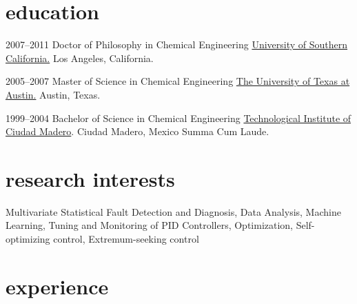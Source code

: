 \documentclass[]{../friggeri-cv} %
\begin{document}
\section{education}

\begin{entrylist}


\entry
{2007--2011}
{Doctor of Philosophy {\normalfont in Chemical Engineering}}
{\flushright \href{http://chems.usc.edu}{University of Southern California.} Los Angeles, California.}


\entry
{2005--2007}
{Master of Science {\normalfont in Chemical Engineering}}
{\flushright \href{http://www.che.utexas.edu/}{The University of Texas at Austin.}
Austin, Texas.}


\entry
{1999--2004}
{Bachelor of Science {\normalfont in Chemical Engineering}}
{\flushright \href{http://www.itcm.edu.mx/}{Technological Institute of Ciudad Madero}.
Ciudad Madero, Mexico}
{Summa Cum Laude.}


\end{entrylist}


\section{research interests}
Multivariate Statistical Fault Detection and Diagnosis, Data Analysis, Machine Learning, Tuning and Monitoring of PID Controllers, Optimization, Self-optimizing control, Extremum-seeking control

\section{experience}
\end{document}
